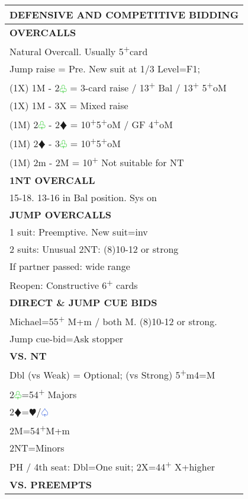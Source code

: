\documentclass{article}
\renewcommand{\sp}{\textcolor{RoyalBlue}{$\varspade$}}
\newcommand{\he}{\textcolor{RubineRed}{$\varheart$}}
\newcommand{\di}{\textcolor{Peach}{$\vardiamond$}}
\newcommand{\cl}{\textcolor{LimeGreen}{$\varclub$}}
\newcommand{\nt}{\relsize{-1}NT\relsize{1}}
\newcommand{\up}{\textsuperscript{+}}
\begin{document}
\noindent
\small{
\begin{minipage}{90mm}
	\begin{tabular}{| p{88mm} |}
		\hline
		\cellcolor[gray]{0.9} \textbf{DEFENSIVE AND COMPETITIVE BIDDING} \\ \hline
		\cellcolor[gray]{0.9} \textbf{OVERCALLS} \\ \hline
		Natural Overcall. Usually 5\up{}card \\ \hline
		Jump raise = Pre. New suit at 1/3 Level=F1; \\ \hline
		(1X) 1M - 2\cl{} = 3-card raise / 13\up{} Bal / 13\up{} 5\up{}oM \\ \hline
		(1X) 1M - 3X = Mixed raise \\ \hline
		(1M) 2\cl{} - 2\di{} = 10\up{}5\up{}oM / GF 4\up{}oM \\ \hline
		(1M) 2\di{} - 3\cl{} = 10\up{}5\up{}oM \\ \hline
		(1M) 2m - 2M = 10\up{} Not suitable for \nt{} \\ \hline
		\cellcolor[gray]{0.9} \textbf{1NT OVERCALL} \\ \hline
		15-18. 13-16 in Bal position. Sys on \\ \hline
		\cellcolor[gray]{0.9} \textbf{JUMP OVERCALLS} \\ \hline
		1 suit: Preemptive. New suit=inv \\ \hline
		2 suits: Unusual 2\nt{}: (8)10-12 or strong \\ \hline
		If partner passed: wide range \\ \hline
		Reopen: Constructive 6\up{} cards \\ \hline
		\cellcolor[gray]{0.9} \textbf{DIRECT \& JUMP CUE BIDS} \\ \hline
		Michael=55\up{} M+m / both M. (8)10-12 or strong. \\ \hline
		Jump cue-bid=Ask stopper \\ \hline
		\cellcolor[gray]{0.9} \textbf{VS. NT} \\ \hline
		Dbl (vs Weak) = Optional; (vs Strong) 5\up{}m4=M \\ \hline
		2\cl{}=54\up{} Majors\\ \hline
		2\di{}=\he{}/\sp{}\\ \hline
		2M=54\up{}M+m\\ \hline
		2\nt{}=Minors\\ \hline
		PH / 4th seat: Dbl=One suit; 2X=44\up{} X+higher \\ \hline
		\cellcolor[gray]{0.9} \textbf{VS. PREEMPTS} \\ \hline

\end{tabular}
\end{minipage}}
\end{document}
